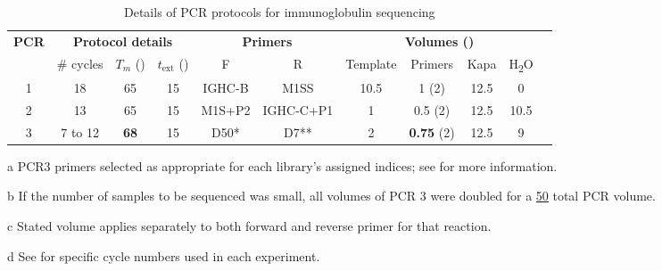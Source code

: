 \begin{table}[h]
\def\arraystretch{1.3}
\centering\small
\begin{threeparttable}
\caption{Details of PCR protocols for \Nfu immunoglobulin sequencing}
\begin{tabular}{c|ccc|cc|ccccc}\toprule
\multirow{2}{*}{\textbf{PCR}} & \multicolumn{3}{c|}{\textbf{Protocol details}} & \multicolumn{2}{c|}{\textbf{Primers}} & \multicolumn{4}{c}{\textbf{Volumes (\ul{})\tnote{b}}}\\
 & \# cycles & $T_m$ (\degC{}) & $t_\mathrm{ext}$ (\secs{}) & F & R & Template & Primers\tnote{c} & Kapa & H\textsubscript{2}O \\\midrule
1 & 18 & 65 & 15 & IGHC-B & M1SS & 10.5 & 1 (\x{}2) & 12.5 & 0 \\\midrule
2 & 13 & 65 & 15 & M1S+P2 & IGHC-C+P1 & 1 & 0.5 (\x{}2) & 12.5 & 10.5 \\\midrule
3 & 7 to 12\tnote{d} & \textbf{68} & 15 & D50*\tnote{a} & D7**\tnote{a} & 2 & \textbf{0.75} (\x{}2) & 12.5 & 9 \\
\bottomrule
\end{tabular}
\begin{tablenotes}
\item[a] PCR3 primers selected as appropriate for each library's assigned indices; see  for more information.
\item[b] If the number of samples to be sequenced was small, all volumes of PCR 3 were doubled for a \ul{50} total PCR volume.
\item[c] Stated volume applies separately to both forward and reverse primer for that reaction.
\item[d] See  for specific cycle numbers used in each experiment.
\end{tablenotes}
\label{tab:methods_igseq_pcr}
\end{threeparttable}
\end{table}

